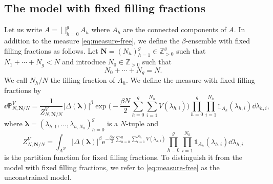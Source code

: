 \documentclass[10pt,a4paper]{amsart}
\numberwithin{equation}{section}
\newcommand{\ee}{\mathrm{e}}
\newcommand{\NN}{\mathbb{Z}_{>0}}
\newcommand{\ind}{\mathds{1}}
\begin{document}
\subsection{The model with fixed filling fractions}

Let us write $A = \bigsqcup_{h=0}^{g} A_{h}$ where $A_h$ are the connected components of $A$. In addition to the measure \eqref{eq:measure-free}, we define the
$\beta$-ensemble with fixed filling fractions as follows. Let
$\bm{N} = (N_{h})_{h = 1}^{g} \in \NN^{g}$ such that $N_1 + \cdots + N_g < N$ and introduce $N_0 \in \mathbb{Z}_{> 0}$ such that
\[
 N_{0} + \cdots + N_{g} = N.
\]
We call $N_h/N$ the filling fraction of $A_h$. We define the measure with fixed filling fractions by
\begin{equation*}%
 \dd\mathbb{P}_{N,\bm{N}/N}^V = \frac{1}{Z^{V}_{N,\bm{N}/N}}|\Delta(\bm{\lambda})|^{\beta}\exp\Biggl(-\frac{\beta N}{2}\sum_{h = 0}^{g} \sum_{i = 1}^{N_h} V(\lambda_{h, i})\Biggr)\prod_{h=0}^{g}\prod_{i=1}^{N_h}\ind_{A_{h}}(\lambda_{h, i})\dd\lambda_{h, i},
\end{equation*}
where
$\bm{\lambda} = (\lambda_{h, 1}, \ldots, \lambda_{h, N_{h}})_{h = 0}^{g}$ is a $N$-tuple and
\begin{equation*}
 Z^{V}_{N,\bm{N}/N} = \int_{A^{N}} |\Delta(\bm{\lambda})|^{\beta}\ee^{-\frac{\beta N}{2}\sum_{h = 0}^{g} \sum_{i = 1}^{N_h} V(\lambda_{h, i})}\prod_{h=0}^{g}\prod_{i=1}^{N_h}\ind_{A_{h}}(\lambda_{h, i})\dd\lambda_{h, i}
\end{equation*}
is the partition function for fixed filling fractions. To distinguish it from the model with fixed filling fractions, we refer to \eqref{eq:measure-free} as the unconstrained model.
\end{document}
